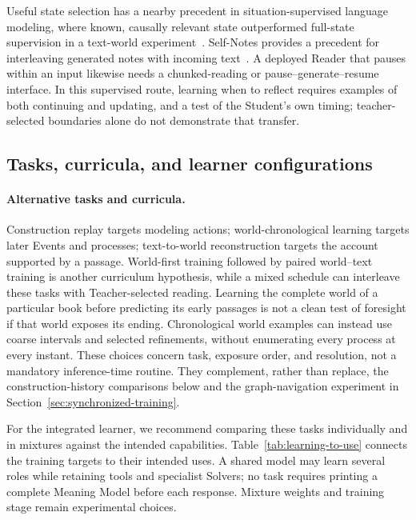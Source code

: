 \documentclass[10pt]{article}
\begin{document}
Useful state selection has a nearby precedent in situation-supervised language
modeling, where known, causally relevant state outperformed full-state
supervision in a text-world experiment~\cite{li2023situations}. Self-Notes
provides a precedent for interleaving generated notes with incoming
text~\cite{lanchantin2023selfnotes}. A deployed Reader that pauses within an
input likewise needs a chunked-reading or pause--generate--resume interface.
In this supervised route, learning when to reflect requires examples of both continuing and updating,
and a test of the Student's own timing; teacher-selected boundaries alone do
not demonstrate that transfer.

\subsection{Tasks, curricula, and learner configurations}
\label{sec:curricula-architectures}

\paragraph{Alternative tasks and curricula.}
Construction replay targets modeling actions; world-chronological learning
targets later Events and processes; text-to-world reconstruction targets the
account supported by a passage. World-first training followed by paired
world--text training is another curriculum hypothesis, while a mixed schedule
can interleave these tasks with Teacher-selected reading. Learning the complete
world of a particular book before predicting its early passages is not a clean
test of foresight if that world exposes its ending. Chronological world
examples can instead use coarse intervals and selected refinements, without
enumerating every process at every instant. These choices concern task,
exposure order, and resolution, not a mandatory inference-time routine.
They complement, rather than replace, the construction-history comparisons
below and the graph-navigation experiment in
Section~\ref{sec:synchronized-training}.

For the integrated learner, we recommend comparing these tasks individually
and in mixtures against the intended capabilities. Table~\ref{tab:learning-to-use}
connects the training targets to their intended uses. A shared model may learn
several roles while retaining tools and specialist Solvers; no task requires
printing a complete Meaning Model before each response. Mixture weights and
training stage remain experimental choices.
\end{document}
